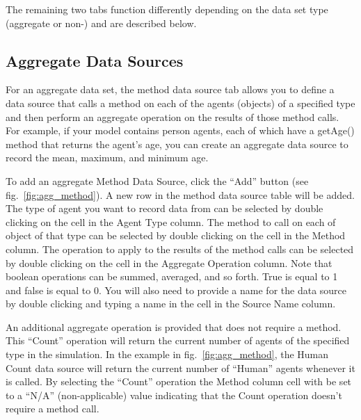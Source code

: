 \documentclass[11pt]{amsart}
\begin{document}
The remaining two tabs function differently depending on the data set type (aggregate or non-) and are described below.

\subsection{Aggregate Data Sources}
For an aggregate data set, the method data source tab allows you to define a data source that calls a method on each of the agents (objects) of a specified type and then perform an aggregate operation on the results of those method calls. For example, if your model contains person agents, each of which have a getAge() method that returns the agent's age, you can create an aggregate data source to record the mean, maximum, and minimum age. 

To add an aggregate Method Data Source, click the ``Add'' button (see fig.~\ref{fig:agg_method}). A new row in the method data source table will be added. The type of agent you want to record data from can be selected by double clicking on the cell in the Agent Type column. The method to call on each of object of that type can be selected by double clicking on the cell in the Method column. The operation to apply to the results of the method calls can be selected by double clicking on the cell in the Aggregate Operation column. Note that boolean operations can be summed, averaged, and so forth. True is equal to 1 and false is equal to 0. You will also need to provide a name for the data source by double clicking and typing a name in the cell in the  Source Name column. 

An additional aggregate operation is provided that does not require a method. This ``Count'' operation will return the current number of agents of the specified type in the simulation. In the example in  fig.~\ref{fig:agg_method}, the Human Count data source will return the current number of ``Human'' agents whenever it is called. By selecting the ``Count'' operation the Method column cell with be set to a ``N/A'' (non-applicable) value indicating that the Count operation doesn't require a method call.
\end{document}
